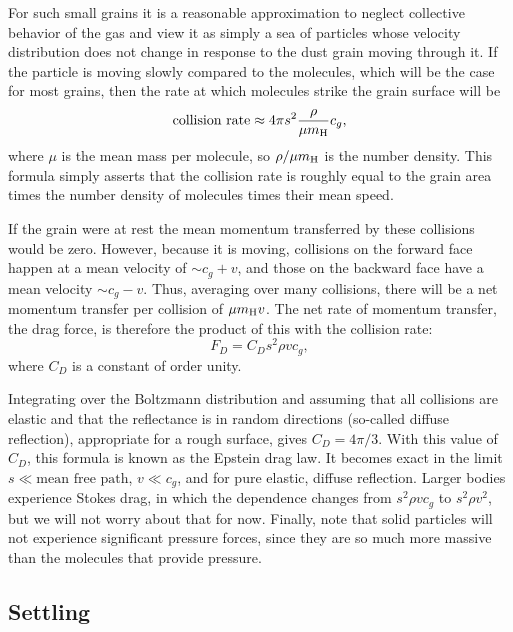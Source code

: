For such small grains it is a reasonable approximation to neglect collective behavior of the gas and view it as simply a sea of particles whose velocity distribution does not change in response to the dust grain moving through it. If the particle is moving slowly compared to the molecules, which will be the case for most grains, then the rate at which molecules strike the grain surface will be
\begin{equation}
\mbox{collision rate} \approx 4\pi s^2 \frac{\rho}{\mu m_{\rm H}} c_g,
\end{equation}
where $\mu$ is the mean mass per molecule, so $\rho/\mu m_{\rm H}$ is the number density. This formula simply asserts that the collision rate is roughly equal to the grain area times the number density of molecules times their mean speed.

If the grain were at rest the mean momentum transferred by these collisions would be zero. However, because it is moving, collisions on the forward face happen at a mean velocity of $\sim c_g+v$, and those on the backward face have a mean velocity $\sim c_g-v$. Thus, averaging over many collisions, there will be a net momentum transfer per collision of $\mu m_{\rm H} v$. The net rate of momentum transfer, the drag force, is therefore the product of this with the collision rate:
\begin{equation}
F_D = C_D s^2 \rho v c_g,
\end{equation}
where $C_D$ is a constant of order unity.

Integrating over the Boltzmann distribution and assuming that all collisions are elastic and that the reflectance is in random directions (so-called diffuse reflection), appropriate for a rough surface, gives $C_D = 4\pi/3$. With this value of $C_D$, this formula is known as the Epstein drag law. It becomes exact in the limit $s\ll \mbox{mean free path}$, $v \ll c_g$, and for pure elastic, diffuse reflection. Larger bodies experience Stokes drag, in which the dependence changes from $s^2 \rho v c_g$ to $s^2 \rho v^2$, but we will not worry about that for now. Finally, note that solid particles will not experience significant pressure forces, since they are so much more massive than the molecules that provide pressure.

\subsection{Settling}

